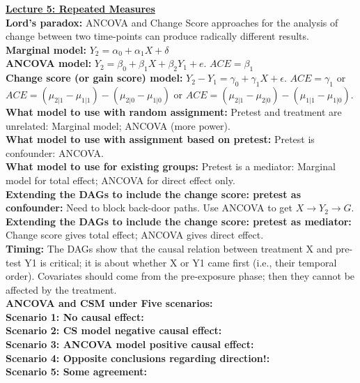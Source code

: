 \documentclass[a4paper,7pt,landscape]{extarticle}
\begin{document}
\begin{multicols}{3}
\begin{boxA}
\end{boxA}

\begin{boxA}
\underline{\textbf{Lecture 5: Repeated Measures}}\\
\textbf{Lord's paradox:} ANCOVA and Change Score approaches for the analysis of change between two time-points can produce radically different results.\\
\textbf{Marginal model:} $Y_2 = \alpha_0 + \alpha_1 X + \delta$\\
\textbf{ANCOVA model:} $Y_2 = \beta_0 + \beta_1 X + \beta_2 Y_1 + e$. $ACE = \beta_1$\\
\textbf{Change score (or gain score) model:} $Y_2 - Y_1 = \gamma_0 + \gamma_1 X + \epsilon$. $ACE = \gamma_1$ or $ACE = (\mu_{2|1} - \mu_{1|1}) - (\mu_{2|0} - \mu_{1|0})$ or $ACE = (\mu_{2|1} - \mu_{2|0}) - (\mu_{1|1} - \mu_{1|0})$.\\
\textbf{What model to use with random assignment:} Pretest and treatment are unrelated: Marginal model; ANCOVA (more power).\\
\textbf{What model to use with assignment based on pretest:} Pretest is confounder: ANCOVA.\\
\textbf{What model to use for existing groups:} Pretest is a mediator: Marginal model for total effect; ANCOVA for direct effect only.\\
\textbf{Extending the DAGs to include the change score: pretest as confounder:} Need to block back-door paths. Use ANCOVA to get $X \rightarrow Y_2 \rightarrow G$.\\
\textbf{Extending the DAGs to include the change score: pretest as mediator:} Change score gives total effect; ANCOVA gives direct effect.\\
\textbf{Timing:} The DAGs show that the causal relation between treatment X and pre-test Y1 is critical; it is about whether X or Y1 came first (i.e., their temporal order). Covariates should come from the pre-exposure phase; then they cannot be affected by the treatment.\\
\textbf{ANCOVA and CSM under Five scenarios:}\\
\textbf{Scenario 1: No causal effect:}\\
\textbf{Scenario 2: CS model negative causal effect:}\\
\textbf{Scenario 3: ANCOVA model positive causal effect:}\\
\textbf{Scenario 4: Opposite conclusions regarding direction!:}\\
\textbf{Scenario 5: Some agreement:}\\

\end{boxA}
\end{multicols}
\end{document}
